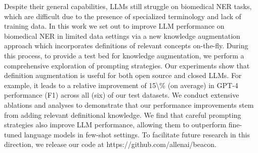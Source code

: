 Despite their general capabilities, LLMs still struggle on biomedical NER tasks, which are difficult due to the presence of specialized terminology and lack of training data.  In this work we set out to improve LLM performance on biomedical NER in limited data settings via a new knowledge augmentation approach which incorporates definitions of relevant concepts on-the-fly.  During this process, to provide a test bed for knowledge augmentation, we perform a comprehensive exploration of prompting strategies.  Our experiments show that definition augmentation is useful for both open source and closed LLMs. For example, it leads to a relative improvement of 15\textbackslash{}\% (on average) in GPT-4 performance (F1) across all (six) of our test datasets.  We conduct extensive ablations and analyses to demonstrate that our performance improvements stem from adding relevant definitional knowledge.  We find that careful prompting strategies also improve LLM performance, allowing them to outperform fine-tuned language models in few-shot settings.   To facilitate future research in this direction, we release our code at https://github.com/allenai/beacon.